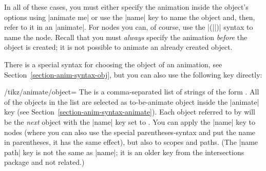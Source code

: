 In all of these cases, you must either specify the animation inside
the object's options using |animate me| or use the |name| key to name
the object and, then, refer to it in an |animate|. For nodes you can, of
course, use the |(||)| syntax to name the node. Recall
that you must \emph{always} specify the animation \emph{before} the
object is created; it is not possible to animate an already created
object.

There is a special syntax for choosing the object of an animation, see
Section~\ref{section-anim-syntax-obj}, but you can also use the
following key directly: 

\begin{key}{/tikz/animate/object=}
  The  is a comma-separated list of strings of
  the form . All of the objects in
  the list are selected as to-be-animate object inside the |animate| key
  (see Section~\ref{section-anim-syntax-animate}). Each object referred
  to by  will be the \emph{next} object with the |name|
  key set to . You can apply the |name| key to nodes
  (where you can also use the special parentheses-syntax and put the
  name in parentheses, it has the same effect), but also to scopes and
  paths. (The |name path| key is not the same as |name|; it is an
  older key from the intersections package and not related.)

\begin{codeexample}[animation list={0.5,1,1.5,2}]
\end{codeexample}
\begin{codeexample}[animation list={0.5,1,1.5,2}]
\end{codeexample}


\end{key}
